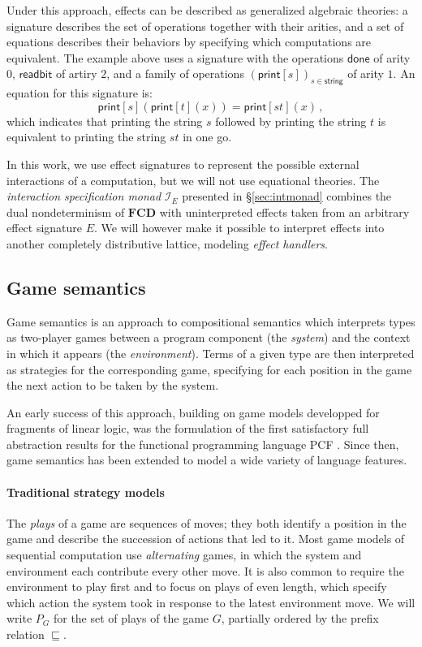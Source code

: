 \documentclass[format=sigplan,authordraft]{acmart}
\newcommand{\kw}[1]{\ensuremath{ \mathsf{#1} }}
\begin{document}
Under this approach,
effects can be described as generalized algebraic theories:
a signature describes the set of operations together with their arities,
and a set of equations describes their behaviors
by specifying which computations are equivalent.
The example above uses a signature with the operations
$\kw{done}$ of arity $0$,
$\kw{readbit}$ of artiry $2$,
and a family of operations $(\kw{print}[s])_{s \in \kw{string}}$
of arity $1$.
An equation for this signature is:
\[
    \kw{print}[s](\kw{print}[t](x)) =
    \kw{print}[st](x) \,,
\]
which indicates that
printing the string $s$ followed by
printing the string $t$ is equivalent to
printing the string $st$ in one go.

In this work,
we use effect signatures to represent
the possible external interactions
of a computation,
but we will not use equational theories.
The \emph{interaction specification monad} $\mathcal{I}_E$
presented in \S\ref{sec:intmonad}
combines the dual nondeterminism of $\mathbf{FCD}$ with
uninterpreted effects taken from
an arbitrary effect signature $E$.
We will however make it possible to interpret effects
into another completely distributive lattice,
modeling \emph{effect handlers}.


\subsection{Game semantics} \label{sec:strat} %

Game semantics is an approach to compositional semantics
which interprets types as two-player games
between a program component (the \emph{system})
and the context in which it appears (the \emph{environment}).
Terms of a given type are then interpreted as
strategies for the corresponding game,
specifying for each position in the game
the next action to be taken by the system.

An early success of this approach,
building on game models developped for
fragments of linear logic,
was the formulation of the first satisfactory
full abstraction results
for the functional programming language PCF \cite{pcfajm,pcfho}.
Since then,
game semantics has been extended to
model a wide variety of language features.

\paragraph{Traditional strategy models} %

The \emph{plays} of a game are sequences of moves;
they both identify a position in the game
and describe the succession of actions that led to it.
Most game models of sequential computation
use \emph{alternating} games,
in which
the system and environment each contribute
every other move.
It is also common to require the environment to play first
and to focus on plays of even length,
which specify which action the system took
in response to the latest environment move.
We will write $P_G$ for the set of plays of the game $G$,
partially ordered by the prefix relation $\sqsubseteq$.
\end{document}

